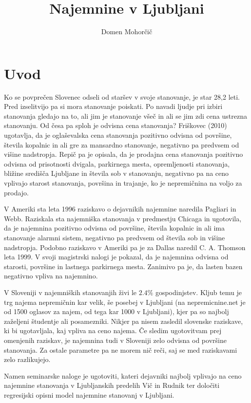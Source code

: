 \documentclass[a4paper, 12pt]{article}
\begin{document}
\title{Najemnine v Ljubljani}
\author{Domen Mohorčič}
\maketitle

\section{Uvod}

Ko se povprečen Slovenec odseli od staršev v svoje stanovanje, je star 28,2
leti. Pred izselitvijo pa si mora stanovanje poiskati. Po navadi ljudje pri izbiri
stanovanja gledajo na to, ali jim je stanovanje všeč in ali se jim zdi cena
ustrezna stanovanju. Od česa pa sploh je odvisna cena stanovanja? Friškovec
(2010) ugotavlja, da je oglaševalska cena stanovanja pozitivno odvisna od
površine, števila kopalnic in ali gre za mansardno stanovanje, negativno pa
predvsem od višine nadstropja. Repič pa je opisala, da je prodajna cena
stanovanja pozitivno odvisna od prisotnosti dvigala, parkirnega mesta,
opremljenosti stanovanja, bližine središča Ljubljane in števila sob v
stanovanju, negativno pa na ceno vplivajo starost stanovanja, površina in
trajanje, ko je nepremičnina na voljo za prodajo.

V Ameriki sta leta 1996 raziskavo o dejavnikih najemnine naredila Pagliari
in Webb. Raziskala sta najemniška stanovanja v predmestju Chicaga in ugotovila,
da je najemnina pozitivno odvisna od površine, števila kopalnic in ali ima
stanovanje alarmni sistem, negativno pa predvsem od števila sob in višine
nadstropja. Podobno raziskavo v Ameriki pa je za Dallas naredil C. A. Thomson
leta 1999. V svoji magistrski nalogi je pokazal, da je najemnina odvisna od
starosti, površine in lastnega parkirnega mesta. Zanimivo pa je, da lasten
bazen negativno vpliva na najemnino.

V Sloveniji v najemniških stanovanjih živi le $ 2.4\% $ gospodinjstev.
Kljub temu je trg najema nepremičnin kar velik, še posebej v Ljubljani (na
nepremicnine.net je od 1500 oglasov za najem, od tega kar 1000 v Ljubljani),
kjer pa so najbolj zaželjeni študentje ali posamezniki. Nikjer pa nisem
zasledil slovenske raziskave, ki bi ugotavljala, kaj vpliva na ceno najema.
Če sledim ugotovitvam prej omenjenih raziskav, je najemnina tudi v Sloveniji zelo
odvisna od površine stanovanja. Za ostale parametre pa ne morem nič reči, saj
se med raziskavami zelo razlikujejo.

Namen seminarske naloge je ugotoviti, kateri dejavniki najbolj vplivajo na ceno
najemnine stanovanja v Ljubljanskih predelih Vič in Rudnik ter določiti
regresijski opisni model najemnine stanovanj v Ljubljani.
\end{document}
